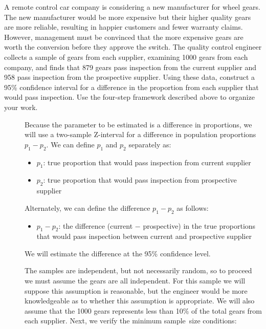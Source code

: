 \begin{examplewrap}
\begin{nexample}{A remote control car company is considering a new manufacturer for wheel gears. The new manufacturer would be more expensive but their higher quality gears are more reliable, resulting in happier customers and fewer warranty claims. However, management must be convinced that the more expensive gears are worth the conversion before they approve the switch. The quality control engineer collects a sample of gears from each supplier, examining 1000 gears from each company, and finds that 879 gears pass inspection from the current supplier and 958 pass inspection from the prospective supplier. Using these data, construct a 95\% confidence interval for a difference in the proportion from each supplier that would pass inspection.  Use the four-step framework described above to organize your work.}
\label{RemoteControl}
\begin{description}
\item[] Because the parameter to be estimated is a difference in proportions, we will use a two-sample Z-interval for a difference in population proportions $p_1 - p_2$.  We can define $p_1$ and $p_2$ separately as: 
\begin{itemize}
\item[] $p_1$:  true proportion that would pass inspection from  current supplier 
\item[] $p_2$:  true proportion that would pass inspection from prospective supplier
\end{itemize}
Alternately, we can define the difference $p_1-p_2$ as follows:
\begin{itemize}
\item[] $p_1-p_2$: the difference (current $-$ prospective) in the true proportions that would pass inspection between current and prospective supplier
\end{itemize}
We will estimate the difference at the 95\% confidence level.  
\item[] The samples are independent, but not necessarily random, so to proceed we must assume the gears are all independent. For this sample we will suppose this assumption is reasonable, but the engineer would be more knowledgeable as to whether this assumption is appropriate. We will also assume that the 1000 gears represents less than 10\% of the total gears from each supplier. Next, we verify the minimum sample~size conditions:
\begin{align*}

\end{align*}
\end{description}
\end{nexample}
\end{examplewrap}
